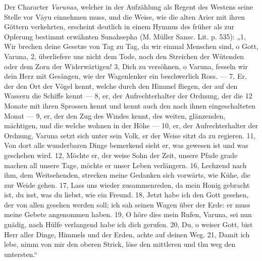 \documentclass{article}
\begin{document}
Der Character \emph{Varunas}, welcher in der Aufzählung als Regent des Westens seine Stelle vor V\={a}yu einnehmen muss, und die Weise, wie die alten Arier mit ihren Göttern verkehrten, erscheint deutlich in einem Hymnus des früher als zur Opferung bestimmt erwähnten Sunahsepha (M. Müller Sansc. Lit. p. 535): „1, Wir brechen deine Gesetze von Tag zu Tag, da wir einmal Menschen sind, o Gott, Varuna, 2, überliefere uns nicht dem Tode, noch den Streichen der Wütenden oder dem Zorn der Widerwärtigen! 3, Dich zu versöhnen, o Varuna, fesseln wir dein Herz mit Gesängen, wie der Wagenlenker ein beschwerlich Ross. — 7, Er, der den Ort der Vögel kennt, welche durch den Himmel fliegen, der auf den Wassern die Schiffe kennt — 8, er, der Aufrechterhalter der Ordnung, der die 12 Monate mit ihren Sprossen kennt und kennt auch den nach ihnen eingeschalteten Monat — 9, er, der den Zug des Windes kennt, des weiten, glänzenden, mächtigen, und die welche wohnen in der Höhe — 10, er, der Aufrechterhalter der Ordnung, Varuna setzt sich unter sein Volk, er der Weise sitzt da zu regieren. 11, Von dort alle wunderbaren Dinge bemerkend sieht er, was gewesen ist und was geschehen wird. 12, Möchte er, der weise Sohn der Zeit, unsere Pfade grade machen all unsere Tage, möchte er unser Leben verlängern. 16, Lechzend nach ihm, dem Weitsehenden, strecken meine Gedanken sich vorwärts, wie Kühe, die zur Weide gehen. 17, Lass uns wieder zusammenreden, da mein Honig gebracht ist, du isst, was du liebst, wie ein Freund. 18, Jetzt habe ich den Gott gesehen, der von allen gesehen werden soll; ich sah seinen Wagen über der Erde: er muss meine Gebete angenommen haben. 19, O höre dies mein Rufen, Varuna, sei nun gnädig, nach Hülfe verlangend habe ich dich gerufen. 20, Du, o weiser Gott, bist Herr aller Dinge, Himmels und der Erden, achte auf deinen Weg. 21, Damit ich lebe, nimm von mir den oberen Strick, löse den mittleren und thu weg den untersten.“
\end{document}
